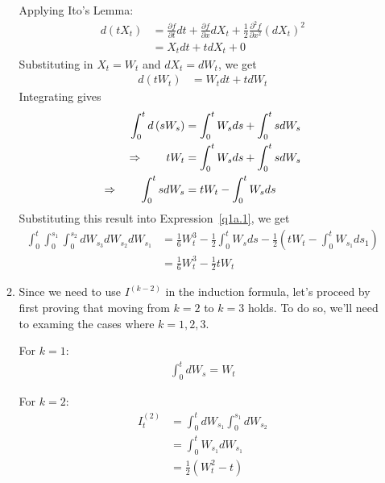 \documentclass[12pt]{article}
\theoremstyle{plain}
\theoremstyle{definition}
\theoremstyle{remark}
\begin{document}
\begin{enumerate}
\begin{enumerate}
        Applying Ito's Lemma:
        \begin{align*}
          d\left(tX_t\right)
            &= \frac{\partial f}{\partial t} dt
              + \frac{\partial f}{\partial x} dX_t
              + \frac{1}{2} \frac{\partial^2 f}{\partial x^2} (dX_t)^2\\
            &= X_t dt + t dX_t + 0
        \end{align*}
        Substituting in $X_t = W_t$ and $dX_t = dW_t$, we get
        \begin{align*}
          d\left(tW_t\right) &= W_t dt + t dW_t
        \end{align*}
        Integrating gives
        \begin{align}
          \int^t_0 d\left(sW_s\right) &= \int^t_0 W_s ds + \int^t_0 s dW_s
          \notag \\
          \Rightarrow \qquad
          tW_t &= \int^t_0 W_s ds + \int^t_0 s dW_s\notag \\
          \Rightarrow \qquad
          \int^t_0 s dW_s &=
            tW_t - \int^t_0 W_s ds
            \label{q1a.2}
        \end{align}
        Substituting this result into Expression~\ref{q1a.1}, we get
        \begin{align*}
          \int^t_0 \int_0^{s_1} \int_0^{s_2} dW_{s_3}dW_{s_2}dW_{s_1}
          &= \frac{1}{6}W_t^3 - \frac{1}{2}\int^t_0 W_s ds
            -\frac{1}{2} \left(
              tW_t - \int^t_0 W_{s_1} ds_1
            \right) \\
          &= \frac{1}{6}W_t^3 -\frac{1}{2} tW_t
        \end{align*}

      \item %
        Since we need to use $I^{(k-2)}$ in the induction formula, let's
        proceed by first proving that moving from $k=2$ to $k=3$ holds.
        To do so, we'll need to examing the cases where $k=1,2,3$.

        For $k=1$:
        \begin{align*}
          \int^t_0 dW_s = W_t
        \end{align*}

        For $k=2$:
        \begin{align*} I^{(2)}_t
          &= \int^t_0 dW_{s_1} \int^{s_1}_0 dW_{s_2}\\
          &= \int^t_0 W_{s_1} dW_{s_1} \\
          &= \frac{1}{2}(W_t^2 - t)
        \end{align*}


\end{enumerate}
\end{enumerate}
\end{document}
